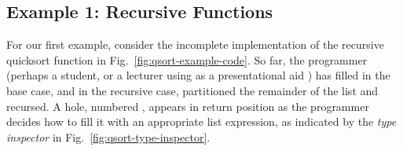 
\subsection{Example 1: Recursive Functions}\label{sec:qsort1}\label{sec:paths}



For our first example, consider the incomplete implementation of the recursive quicksort function in Fig.~\ref{fig:qsort-example-code}. So far, the programmer (perhaps a student, or a lecturer using \Hazel as a presentational aid \cite{Paxton:2002:LPL:771322.771332}) has filled in the base case, and in the recursive case, partitioned the remainder of the list and recursed. A hole, numbered ,  appears in return position as the programmer decides how to fill it with an appropriate list expression, as indicated by the \emph{type inspector} in Fig.~\ref{fig:qsort-type-inspector}.

